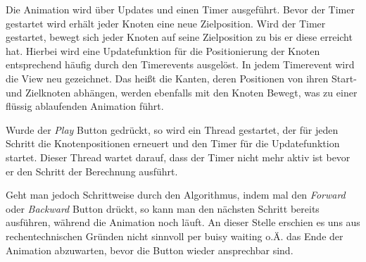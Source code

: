 Die Animation wird über Updates und einen Timer ausgeführt. Bevor der Timer gestartet wird erhält jeder Knoten eine neue Zielposition. Wird der Timer gestartet, bewegt sich jeder Knoten auf seine Zielposition zu bis er diese erreicht hat. Hierbei wird eine Updatefunktion für die Positionierung der Knoten entsprechend häufig durch den Timerevents ausgelöst. In jedem Timerevent wird die View neu gezeichnet. Das heißt die Kanten, deren Positionen von ihren Start- und Zielknoten abhängen, werden ebenfalls mit den Knoten Bewegt, was zu einer flüssig ablaufenden Animation führt.

Wurde der \textit{Play} Button gedrückt, so wird ein Thread gestartet, der für jeden Schritt die Knotenpositionen erneuert und den Timer für die Updatefunktion startet. Dieser Thread wartet darauf, dass der Timer nicht mehr aktiv ist bevor er den Schritt der Berechnung ausführt.

Geht man jedoch Schrittweise durch den Algorithmus, indem mal den \textit{Forward} oder \textit{Backward} Button drückt, so kann man den nächsten Schritt bereits ausführen, während die Animation noch läuft. An dieser Stelle erschien es uns aus rechentechnischen Gründen nicht sinnvoll per buisy waiting o.Ä. das Ende der Animation abzuwarten, bevor die Button wieder ansprechbar sind.


